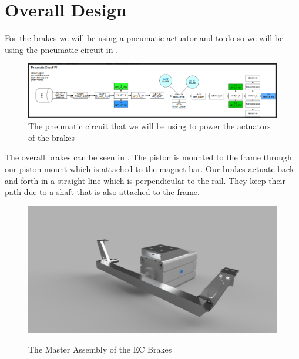 \documentclass[main.tex]{subfiles}
\begin{document}
    \section{Overall Design}
    For the brakes we will be using a pneumatic actuator and to do so we will be using the pneumatic circuit in . \\
    \begin{figure}
        \centering
        \includegraphics[width=\linewidth]{images/EC_Pnuematic_Circuit.png}
        \caption{The pneumatic circuit that we will be using to power the actuators of the brakes}
        \label{fig:pneumatic-circuit}
    \end{figure}
    The overall brakes can be seen in . The piston is mounted to the frame through our piston mount which is attached to the magnet bar. Our brakes actuate back and forth in a straight line which is perpendicular to the rail. They keep their path due to a shaft that is also attached to the frame.
    \begin{figure}
    	\centering
        \includegraphics[width =\linewidth]{images/EC_Brake_Master_2018}
        \label{fig:EC-Assembly}
        \caption{The Master Assembly of the EC Brakes}
    \end{figure}
    
\end{document}

